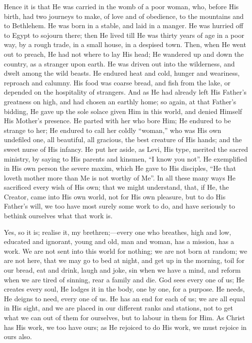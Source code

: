 Hence it is that He was carried in the womb of a poor woman, who,
before His birth, had two journeys to make, of love and of obedience,
to the mountains and to Bethlehem. He was born in a stable, and laid
in a manger. He was hurried off to Egypt to sojourn there; then He
lived till He was thirty years of age in a poor way, by a rough trade,
in a small house, in a despised town. Then, when He went out to
preach, He had not where to lay His head; He wandered up and down the
country, as a stranger upon earth. He was driven out into the
wilderness, and dwelt among the wild beasts. He endured heat and cold,
hunger and weariness, reproach and calumny. His food was coarse bread,
and fish from the lake, or depended on the hospitality of strangers.
And as He had already left His Father's greatness on high, and had
chosen an earthly home; so again, at that Father's bidding, He gave up
the sole solace given Him in this world, and denied Himself His
Mother's presence. He parted with her who bore Him; He endured to be
strange to her; He endured to call her coldly ``woman,'' who
was His own undefiled one, all beautiful, all gracious, the best
creature of His hands; and the sweet nurse of His infancy. He put her
aside, as Levi, His type, merited the sacred ministry, by saying to
His parents and kinsmen, ``I know you not''. He exemplified in
His own person the severe maxim, which He gave to His disciples,
``He that loveth mother more than Me is not worthy of Me''. In
all these many ways He sacrificed every wish of His own; that we might
understand, that, if He, the Creator, came into His own world, not for
His own pleasure, but to do His Father's will, we too have most surely
some work to do, and have seriously to bethink ourselves what that
work is.

Yes, so it is; realise it, my brethren;—every one who breathes,
high and low, educated and ignorant, young and old, man and woman, has
a mission, has a work. We are not sent into this world for nothing; we
are not born at random; we are not here, that we may go to bed at
night, and get up in the morning, toil for our bread, eat and drink,
laugh and joke, sin when we have a mind, and reform when we are tired
of sinning, rear a family and die. God sees every one of us; He
creates every soul, He lodges it in the body, one by one, for a
purpose. He needs, He deigns to need, every one of us. He has an end
for each of us; we are all equal in His sight, and we are placed in
our different ranks and stations, not to get what we can out of them
for ourselves, but to labour in them for Him. As Christ has His work,
we too have ours; as He rejoiced to do His work, we must rejoice in
ours also.

